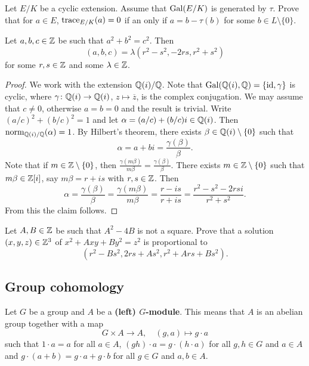 \begin{exercise}
    Let $E/K$ be a cyclic extension. Assume that 
    $\operatorname{Gal}(E/K)$ is generated by $\tau$. Prove that for 
    $a\in E$, $\operatorname{trace}_{E/K}(a)=0$ if an only 
    if $a=b-\tau(b)$ for some $b\in L\setminus\{0\}$.  
\end{exercise}

\begin{corollary}
    Let $a,b,c\in \mathbb{Z}$ be such that $a^2+b^2=c^2$. Then 
    \[
    (a,b,c)=\lambda(r^2-s^2,-2rs, r^2+s^2)
    \]
    for some $r,s\in\mathbb{Z}$ and some $\lambda\in\mathbb{Z}$.
\end{corollary}

\begin{proof}
    We work with the extension $\mathbb{Q}(i)/\mathbb{Q}$. Note that 
    $\operatorname{Gal}(\mathbb{Q}(i),\mathbb{Q})=\{\operatorname{id},\gamma\}$ is cyclic, where 
    $\gamma\colon\mathbb{Q}(i)\to\mathbb{Q}(i)$, $z\mapsto\overline{z}$, is the complex conjugation. 
    We may assume that $c\ne 0$, otherwise $a=b=0$ and the result is trivial.  
    Write $(a/c)^2+(b/c)^2=1$ and let $\alpha=(a/c)+(b/c)i\in\mathbb{Q}(i)$. Then
    $\operatorname{norm}_{\mathbb{Q}(i)/\mathbb{Q}}(\alpha)=1$. 
    By Hilbert's theorem, 
    there exists $\beta\in\mathbb{Q}(i)\setminus\{0\}$ such that 
    \[
    \alpha=a+bi=\frac{\gamma(\beta)}{\beta}.
    \]
    Note that if $m\in\mathbb{Z}\setminus\{0\}$, then 
    $\frac{\gamma(m\beta)}{m\beta}=\frac{\gamma(\beta)}{\beta}$. 
    There exists $m\in\mathbb{Z}\setminus\{0\}$ such that 
    $m\beta\in\mathbb{Z}[i]$, say $m\beta=r+is$ with $r,s\in\mathbb{Z}$. Then
    \[
    \alpha=\frac{\gamma(\beta)}{\beta}=\frac{\gamma(m\beta)}{m\beta}=
    \frac{r-is}{r+is}=\frac{r^2-s^2-2rsi}{r^2+s^2}.
    \]
    From this the claim follows. 
\end{proof}

\begin{exercise}
Let $A,B\in\mathbb{Z}$ be such that $A^2-4B$ is not a square. Prove that 
a solution $(x,y,z)\in\mathbb{Z}^3$ of $x^2 + Axy + By^2 = z^2$
is proportional to 
\[
(r^2-Bs^2,2rs+As^2,r^2+Ars+Bs^2).
\]
\end{exercise}

\subsection{Group cohomology}

Let $G$ be a group and $A$ be a \textbf{(left) $G$-module}. This means that $A$ is an abelian
group together with a map
\[
G\times A\to A,\quad
(g,a)\mapsto g\cdot a
\]
such that $1\cdot a=a$ for all $a\in A$, $(gh)\cdot a=g\cdot (h\cdot a)$ for 
all $g,h\in G$ and $a\in A$ and $g\cdot (a+b)=g\cdot a+g\cdot b$ for
all $g\in G$ and $a,b\in A$. 

